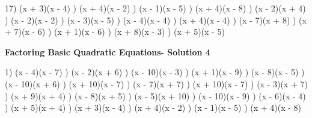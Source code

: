 \documentclass{article}%
\begin{document}
17) (x + 3)(x - 4)%
) (x + 4)(x - 2)%
) (x - 1)(x - 5)%
) (x + 4)(x - 8)%
) (x - 2)(x + 4)%
) (x - 2)(x - 2)%
) (x - 3)(x - 5)%
) (x - 4)(x - 4)%
) (x + 4)(x - 4)%
) (x - 7)(x + 8)%
) (x + 7)(x - 6)%
) (x + 1)(x - 6)%
) (x + 8)(x - 3)%
) (x + 5)(x - 5)%
\newline%
\newpage%
\large%
\begin{center}%
\textbf{Factoring Basic Quadratic Equations- Solution 4}%
\newline%
\end{center} \normalsize%
1) (x - 4)(x - 7)%
) (x - 2)(x + 6)%
) (x - 10)(x - 3)%
) (x + 1)(x - 9)%
) (x - 8)(x - 5)%
) (x - 10)(x + 6)%
) (x + 10)(x - 7)%
) (x - 7)(x + 7)%
) (x + 10)(x - 7)%
) (x - 3)(x + 7)%
) (x + 9)(x + 4)%
) (x - 8)(x + 5)%
) (x - 5)(x + 10)%
) (x - 10)(x - 9)%
) (x - 6)(x - 4)%
) (x + 5)(x + 4)%
) (x + 3)(x - 4)%
) (x + 4)(x - 2)%
) (x - 1)(x - 5)%
) (x + 4)(x - 8)%
\newline%
\end{document}
